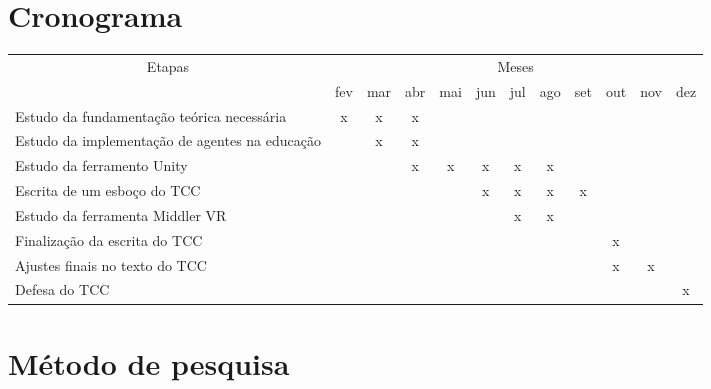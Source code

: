 \documentclass[12pt]{article}
\begin{document}
\newpage
\section{Cronograma}

   \begin{tabularx}{\linewidth}{|X|*{11}{c|}}
        \hline
        \multicolumn{1}{|c|}{\multirow{2}{*}{Etapas}} & \multicolumn{11}{|c|}{Meses}\\ \cline{2-12}
        & fev & mar & abr & mai & jun & jul & ago & set & out & nov & dez   \\ \hline

        Estudo da fundamentação teórica necessária
        &  x  &  x  &  x   &     &      &      &      &      &      &     &      \\ \hline

        Estudo da implementação de agentes na educação
        &     &  x  &  x  &     &      &      &      &      &      &     &     \\ \hline

        Estudo da ferramento Unity
        &     &    &  x  &  x  &  x  &  x  &  x   &     &     &     &   \\ \hline

        Escrita de um esboço do TCC
        &     &     &     &     &  x & x  &  x  &   x   &    &    &     \\ \hline

       Estudo da ferramenta Middler VR
        &     &    &     &     &     &  x   &  x   &   &    &     &      \\ \hline

        Finalização da escrita do TCC
        &     &    &     &     &     &     &     &    &   x  &     &     \\ \hline

        Ajustes finais no texto do TCC
         &     &    &     &     &     &     &     &    &    x  &  x  &   \\ \hline

        Defesa do TCC
        &   &   &   &   &   &   &  &  &   &   &  x  \\ \hline

    \end{tabularx}
\newpage
\section{Método de pesquisa}
\end{document}
